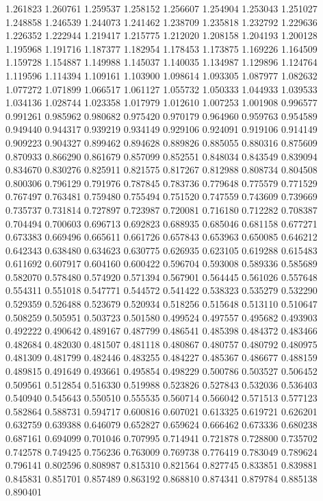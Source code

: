 1.261823
1.260761
1.259537
1.258152
1.256607
1.254904
1.253043
1.251027
1.248858
1.246539
1.244073
1.241462
1.238709
1.235818
1.232792
1.229636
1.226352
1.222944
1.219417
1.215775
1.212020
1.208158
1.204193
1.200128
1.195968
1.191716
1.187377
1.182954
1.178453
1.173875
1.169226
1.164509
1.159728
1.154887
1.149988
1.145037
1.140035
1.134987
1.129896
1.124764
1.119596
1.114394
1.109161
1.103900
1.098614
1.093305
1.087977
1.082632
1.077272
1.071899
1.066517
1.061127
1.055732
1.050333
1.044933
1.039533
1.034136
1.028744
1.023358
1.017979
1.012610
1.007253
1.001908
0.996577
0.991261
0.985962
0.980682
0.975420
0.970179
0.964960
0.959763
0.954589
0.949440
0.944317
0.939219
0.934149
0.929106
0.924091
0.919106
0.914149
0.909223
0.904327
0.899462
0.894628
0.889826
0.885055
0.880316
0.875609
0.870933
0.866290
0.861679
0.857099
0.852551
0.848034
0.843549
0.839094
0.834670
0.830276
0.825911
0.821575
0.817267
0.812988
0.808734
0.804508
0.800306
0.796129
0.791976
0.787845
0.783736
0.779648
0.775579
0.771529
0.767497
0.763481
0.759480
0.755494
0.751520
0.747559
0.743609
0.739669
0.735737
0.731814
0.727897
0.723987
0.720081
0.716180
0.712282
0.708387
0.704494
0.700603
0.696713
0.692823
0.688935
0.685046
0.681158
0.677271
0.673383
0.669496
0.665611
0.661726
0.657843
0.653963
0.650085
0.646212
0.642343
0.638480
0.634623
0.630775
0.626935
0.623105
0.619288
0.615483
0.611692
0.607917
0.604160
0.600422
0.596704
0.593008
0.589336
0.585689
0.582070
0.578480
0.574920
0.571394
0.567901
0.564445
0.561026
0.557648
0.554311
0.551018
0.547771
0.544572
0.541422
0.538323
0.535279
0.532290
0.529359
0.526488
0.523679
0.520934
0.518256
0.515648
0.513110
0.510647
0.508259
0.505951
0.503723
0.501580
0.499524
0.497557
0.495682
0.493903
0.492222
0.490642
0.489167
0.487799
0.486541
0.485398
0.484372
0.483466
0.482684
0.482030
0.481507
0.481118
0.480867
0.480757
0.480792
0.480975
0.481309
0.481799
0.482446
0.483255
0.484227
0.485367
0.486677
0.488159
0.489815
0.491649
0.493661
0.495854
0.498229
0.500786
0.503527
0.506452
0.509561
0.512854
0.516330
0.519988
0.523826
0.527843
0.532036
0.536403
0.540940
0.545643
0.550510
0.555535
0.560714
0.566042
0.571513
0.577123
0.582864
0.588731
0.594717
0.600816
0.607021
0.613325
0.619721
0.626201
0.632759
0.639388
0.646079
0.652827
0.659624
0.666462
0.673336
0.680238
0.687161
0.694099
0.701046
0.707995
0.714941
0.721878
0.728800
0.735702
0.742578
0.749425
0.756236
0.763009
0.769738
0.776419
0.783049
0.789624
0.796141
0.802596
0.808987
0.815310
0.821564
0.827745
0.833851
0.839881
0.845831
0.851701
0.857489
0.863192
0.868810
0.874341
0.879784
0.885138
0.890401
